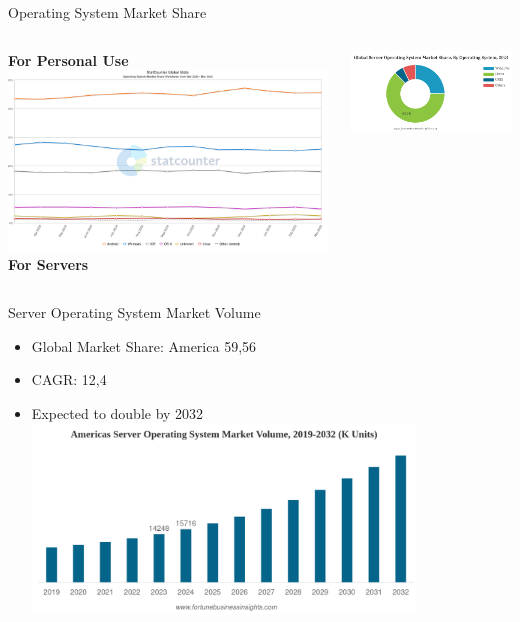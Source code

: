 \documentclass{beamer}
\begin{document}
\begin{frame}{Operating System Market Share} 
  \begin{columns}
      \textbf{For Personal Use}
      \includegraphics[width=\textwidth]{StatCounter.png}
      \textbf{For Servers}
      
      \includegraphics[width=\textwidth]{ServerOSShare.png}
  \end{columns}
\end{frame}

\begin{frame}{Server Operating System Market Volume} 
  \begin{itemize}
    \item Global Market Share: America 59,56\text{\%}
    \item CAGR: 12,4\text{\%}
    \item Expected to double by 2032
    \includegraphics[width=0.8\textwidth]{Server-Market-Volume.png}
  \end{itemize}
\end{frame}
\end{document}
